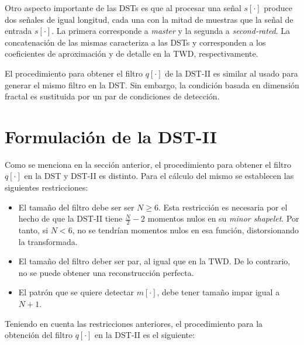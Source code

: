 Otro aspecto importante de las DSTs es que al procesar una señal $s[\cdot]$ produce dos 
señales de igual longitud, cada una con la mitad de muestras que la señal de entrada $s[\cdot]$. La primera 
corresponde a \textit{master} y la segunda a \textit{second-rated}. 
La concatenación de las mismas caracteriza a las DSTs
y corresponden a los coeficientes de aproximación y de detalle en la TWD, respectivamente.

El procedimiento para obtener el filtro $q[\cdot]$ de la DST-II es similar al usado para generar el mismo filtro
en la DST. Sin embargo, la condición basada en dimensión fractal es sustituida por un par de condiciones
de detección.


\section{Formulación de la DST-II}\label{algoritmo:dst-2}

Como se menciona en la sección anterior, el procedimiento para obtener el filtro $q[\cdot]$ en la DST y DST-II
es distinto. Para el cálculo del mismo se establecen las siguientes restricciones:

\begin{itemize}
	\item El tamaño del filtro debe ser ser $N \geq 6$. Esta restricción es necesaria por el hecho de que la 
		DST-II tiene $\frac{N}{2}-2$ momentos nulos en su \textit{minor shapelet}. Por tanto, si $N<6$, no se tendrían momentos nulos en esa función, distorsionando la transformada.
	\item El tamaño del filtro deber ser par, al igual que en la TWD. De lo contrario, no se puede obtener una 
		reconstrucción perfecta.
	\item El patrón que se quiere detectar $m[\cdot]$, debe tener tamaño impar igual a $N+1$.
\end{itemize}

Teniendo en cuenta las restricciones anteriores, el procedimiento para la obtención del filtro $q[\cdot]$ en la DST-II 
es el siguiente:

